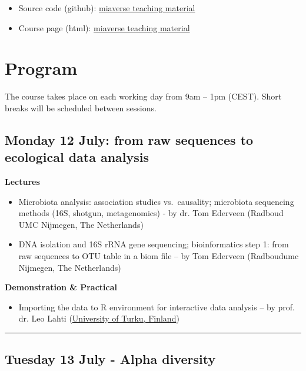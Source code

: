 \documentclass[
  oneside]{book}
\providecommand{\tightlist}{%
  \setlength{\itemsep}{0pt}\setlength{\parskip}{0pt}}
\begin{document}
\begin{itemize}
\tightlist
\item
  Source code (github): \href{https://github.com/microbiome/course_2021_radboud}{miaverse teaching material}
\item
  Course page (html): \href{https://microbiome.github.io/course_2021_radboud/}{miaverse teaching material}
\end{itemize}

\hypertarget{program}{%
\chapter{Program}\label{program}}

The course takes place on each working day from 9am -- 1pm
(CEST). Short breaks will be scheduled between sessions.

\hypertarget{monday-12-july-from-raw-sequences-to-ecological-data-analysis}{%
\section{Monday 12 July: from raw sequences to ecological data analysis}\label{monday-12-july-from-raw-sequences-to-ecological-data-analysis}}

\textbf{Lectures}

\begin{itemize}
\item
  Microbiota analysis: association studies vs.~causality; microbiota sequencing methods (16S, shotgun, metagenomics) - by dr. Tom Ederveen (Radboud UMC Nijmegen, The Netherlands)
\item
  DNA isolation and 16S rRNA gene sequencing; bioinformatics step 1: from raw sequences to OTU table in a biom file -- by Tom Ederveen (Radboudumc Nijmegen, The Netherlands)
\end{itemize}

\textbf{Demonstration \& Practical}

\begin{itemize}
\tightlist
\item
  Importing the data to R environment for interactive data analysis -- by prof. dr. Leo Lahti (\href{datascience.utu.fi}{University of Turku, Finland})
\end{itemize}

\begin{center}\rule{0.5\linewidth}{0.5pt}\end{center}

\hypertarget{tuesday-13-july---alpha-diversity}{%
\section{Tuesday 13 July - Alpha diversity}\label{tuesday-13-july---alpha-diversity}}
\end{document}
